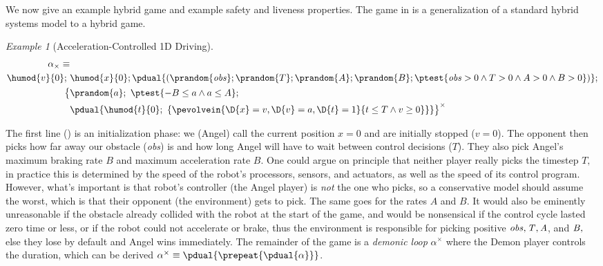 \documentclass[12pt]{cmuthesis}
\theoremstyle{definition}
\theoremstyle{remark}
\newtheorem{example}{Example}
\newcommand{\rref}[2][]{\prettyref{#2}}
\begin{document}
We now give an example hybrid game and example safety and liveness properties.
The game in \rref{ex:driving-game} is a generalization of a standard hybrid systems model to a hybrid game.
\newcommand{\obsvar}{{\it obs}\xspace}
\newcommand{\Tvar}{{\it T}\xspace}
\newcommand{\Avar}{{\it A}\xspace}
\newcommand{\Bvar}{{\it B}\xspace}
\newcommand{\xvar}{{\it x}\xspace}
\newcommand{\vvar}{{\it v}\xspace}
\newcommand{\avar}{{\it a}\xspace}
\begin{example}[Acceleration-Controlled 1D Driving]
\label{ex:driving-game}
\begin{align}
\alpha_\times\equiv&\\
\label{eq:driving-init}\humod{v}{0};~&\humod{x}{0};\pdual{(\prandom{\obsvar};\prandom{T};\prandom{A};\prandom{B}; \ptest{\obsvar > 0 \land T > 0 \land A > 0 \land B > 0})};\\
\label{eq:driving-angel}\big\{ &\prandom{a};~\ptest{-B \leq a \land a \leq A};\\ 
\label{eq:driving-demon}       &\pdual{\humod{t}{0};~\{\pevolvein{\D{x}=v, \D{v}=a, \D{t}=1}{t \leq T \land v \geq 0}\}}\big\}^\times
\end{align}
\end{example}
The first line (\rref{eq:driving-init}) is an initialization phase: we (Angel) call the current position $x = 0$ and are initially stopped ($v = 0$).
The opponent then picks how far away our obstacle (\obsvar) is and how long Angel will have to wait between control decisions ($T$).
They also pick Angel's maximum braking rate $B$ and maximum acceleration rate $B$.
One could argue on principle that neither player really picks the timestep $T,$ in practice this is determined by the speed of the robot's processors, sensors, and actuators, as well as the speed of its control program.
However, what's important is that robot's controller (the Angel player) is \emph{not} the one who picks, so a conservative model should assume the worst, which is that their opponent (the environment) gets to pick.
The same goes for the rates $A$ and $B$.
It would also be eminently unreasonable if the obstacle already collided with the robot at the start of the game, and would be nonsensical if the control cycle lasted zero time or less, or if the robot could not accelerate or brake, thus the environment is responsible for picking positive $\obsvar, \Tvar, \Avar$, and  $\Bvar,$ else they lose by default and Angel wins immediately.
The remainder of the game is a \emph{demonic loop} $\alpha^\times$ where the Demon player controls the duration, which can be derived $\alpha^\times \equiv \pdual{{\prepeat{{\pdual{{\alpha}}}}}}$.
\end{document}
